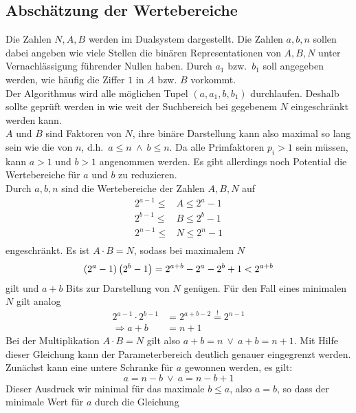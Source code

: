 \subsection{Abschätzung der Wertebereiche}\label{sec:parameterspace}
Die Zahlen $N,A,B$ werden im Dualsystem dargestellt. Die Zahlen $a,b,n$ sollen dabei angeben wie viele Stellen die binären Representationen von $A,B,N$ unter Vernachlässigung führender Nullen haben. Durch $a_1$ bzw.\ $b_1$ soll angegeben werden, wie häufig die Ziffer $1$ in $A$ bzw. $B$ vorkommt. \\
Der Algorithmus wird alle möglichen Tupel $\left(a,a_1,b,b_1\right)$ durchlaufen. Deshalb sollte geprüft werden in wie weit der Suchbereich bei gegebenem $N$ eingeschränkt werden kann. \\
$A$ und $B$ sind Faktoren von $N$, ihre binäre Darstellung kann also maximal so lang sein wie die von $n$, d.h.\ $a\leq n\:\wedge\: b\leq n$. Da alle Primfaktoren $p_i > 1$ sein müssen, kann $a>1$ und $b>1$ angenommen werden. Es gibt allerdings noch Potential die Wertebereiche für $a$ und $b$ zu reduzieren. \\
Durch $a,b,n$ sind die Wertebereiche der Zahlen $A,B,N$ auf
\begin{align*}
		2^{a-1}\leq &A \leq 2^a-1 \\
		2^{b-1}\leq &B \leq 2^b-1 \\
		2^{n-1}\leq &N \leq 2^n-1 \\
\end{align*}
engeschränkt. Es ist $A\cdot B=N$, sodass bei maximalem $N$
\begin{equation*}
		\left(2^a-1\right)\left(2^b-1\right)=2^{a+b}-2^a-2^b+1<2^{a+b} \\
\end{equation*}
gilt und $a+b$ Bits zur Darstellung von $N$ genügen. Für den Fall eines minimalen $N$ gilt analog
\begin{align*}
		2^{a-1}\cdot 2^{b-1}&=2^{a+b-2}\overset{!}{=}2^{n-1} \\
		\Rightarrow a+b&=n+1
\end{align*}
Bei der Multiplikation $A\cdot B =N$ gilt also $a+b=n\:\vee\:a+b=n+1$. Mit Hilfe dieser Gleichung kann der Parameterbereich deutlich genauer eingegrenzt werden. \\
Zunächst kann eine untere Schranke für $a$ gewonnen werden, es gilt:
\begin{equation*}
		a=n-b \:\vee\: a=n-b+1
\end{equation*}
Dieser Ausdruck wir minimal für das maximale $b \leq a$, also $a=b$, so dass der minimale Wert für $a$ durch die Gleichung
